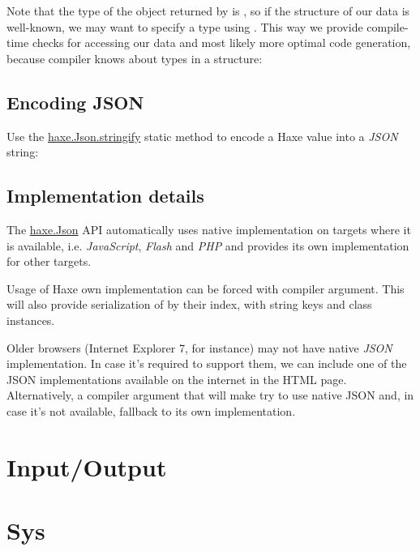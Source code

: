 Note that the type of the object returned by  is , so if the structure of our data is well-known, we may want to specify a type using . This way we provide compile-time checks for accessing our data and most likely more optimal code generation, because compiler knows about types in a structure:

\subsection{Encoding JSON}
\label{std-Json-encoding}

Use the \href{https://api.haxe.org/haxe/Json.html#stringify}{haxe.Json.stringify} static method to encode a Haxe value into a \emph{JSON} string:


\subsection{Implementation details}
\label{std-Json-implementation-details}

The \href{https://api.haxe.org/haxe/Json.html}{haxe.Json} API automatically uses native implementation on targets where it is available, i.e. \emph{JavaScript}, \emph{Flash} and \emph{PHP} and provides its own implementation for other targets.

Usage of Haxe own implementation can be forced with  compiler argument. This will also provide serialization of  by their index,  with string keys and class instances.

Older browsers (Internet Explorer 7, for instance) may not have native \emph{JSON} implementation. In case it's required to support them, we can include one of the JSON implementations available on the internet in the HTML page. Alternatively, a  compiler argument that will make  try to use native JSON and, in case it's not available, fallback to its own implementation.

\section{Input/Output}
\label{std-input-output}

\section{Sys}
\label{std-sys}

